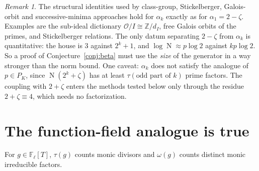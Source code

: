\documentclass[11pt]{amsart}
\theoremstyle{definition}
\theoremstyle{remark}
\newtheorem{remark}[theorem]{Remark}
\newcommand{\cO}{\mathcal{O}}
\newcommand{\Z}{\mathbb{Z}}
\newcommand{\F}{\mathbb{F}}
\DeclareMathOperator{\Nm}{N}
\begin{document}
\begin{remark}
The structural identities used by class-group, Stickelberger, Galois-orbit and successive-minima approaches hold for
$\alpha_k$ exactly as for $\alpha_1=2-\zeta$. Examples are the sub-ideal dictionary $\cO/I\cong\Z/d_I$, free Galois orbits of the primes, and
Stickelberger relations. The only datum separating $2-\zeta$ from $\alpha_k$ is quantitative: the house is $3$
against $2^k+1$, and $\log\Nm\approx p\log2$ against $kp\log2$. So a proof of Conjecture~\ref{conj:beta} must use the
\emph{size} of the generator in a way stronger than the norm bound. One caveat: $\alpha_k$ does not satisfy the analogue
of $p\in P_K$, since $\Nm(2^k+\zeta)$ has at least $\tau(\text{odd part of }k)$ prime factors. The coupling with
$2+\zeta$ enters the methods tested below only through the residue $2+\zeta\equiv4$, which needs no factorization.
\end{remark}

\section{The function-field analogue is true}
For $g\in\F_\ell[T]$, $\tau(g)$ counts monic divisors and $\omega(g)$ counts distinct monic irreducible factors.
\end{document}
